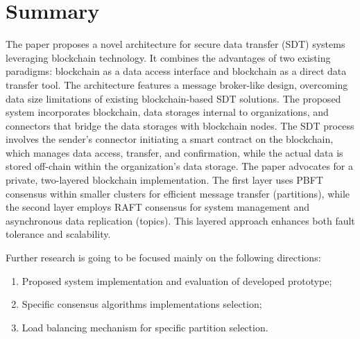 \documentclass[10pt]{llncs}
\begin{document}
\section{Summary} \label{summary}

The paper proposes a novel architecture for secure data transfer (SDT) systems leveraging blockchain technology. 
It combines the advantages of two existing paradigms: blockchain as a data access interface and blockchain as a direct data transfer tool. 
The architecture features a message broker-like design, overcoming data size limitations of existing blockchain-based SDT solutions. 
The proposed system incorporates blockchain, data storages internal to organizations, and connectors that bridge the data storages with blockchain nodes. 
The SDT process involves the sender's connector initiating a smart contract on the blockchain, which manages data access, transfer, and confirmation, while the actual data is stored off-chain within the organization's data storage. The paper advocates for a private, two-layered blockchain implementation. 
The first layer uses PBFT consensus within smaller clusters for efficient message transfer (partitions), while the second layer employs RAFT consensus for system management and asynchronous data replication (topics). 
This layered approach enhances both fault tolerance and scalability. 

Further research is going to be focused mainly on the following directions:

\begin{enumerate}
    \item Proposed system implementation and evaluation of developed prototype;
    \item Specific consensus algorithms implementations selection;
    \item Load balancing mechanism for specific partition selection.
\end{enumerate}



\end{document}
